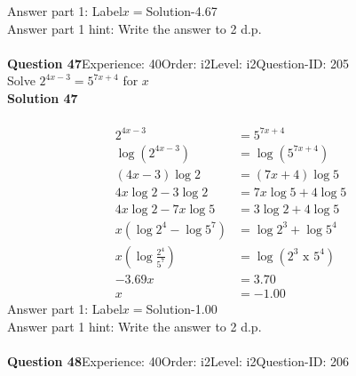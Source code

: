 \documentclass{article}
\begin{document}
Answer part 1: \hspace{10pt}Label\hspace{10pt}$x=$\hspace{10pt}Solution\hspace{10pt}-4.67\\
Answer part 1 hint: \hspace{15pt}Write the answer to 2 d.p.\\
\\[4pt]
\noindent\textbf{Question 47}\hspace{20pt}Experience: 40\hspace{20pt}Order: i2\hspace{20pt}Level: i2\hspace{20pt}Question-ID: 205\\[2pt]
Solve $2^{4x-3}=5^{7x+4}$ for $x$\\[4pt]
\noindent\textbf{Solution 47}\\[2pt]
\\[-35pt]\begin{align*}
2^{4x-3}&=5^{7x+4}\\[2pt]
\log(2^{4x-3})&=\log(5^{7x+4})\\[2pt]
(4x-3)\log2&=(7x+4)\log5\\[2pt]
4x\log2-3\log2&=7x\log5+4\log5\\[2pt]
4x\log2-7x\log5&=3\log2+4\log5\\[2pt]
x(\log2^4-\log5^7)&=\log2^3+\log5^4\\[2pt]
x\left(\log\displaystyle\frac{2^4}{5^7}\right)&=\log(2^3\,\,\text{x}\,\,5^4)\\[2pt]
-3.69x&=3.70\\[2pt]
x&=-1.00
\end{align*}
Answer part 1: \hspace{10pt}Label\hspace{10pt}$x=$\hspace{10pt}Solution\hspace{10pt}-1.00\\
Answer part 1 hint: \hspace{15pt}Write the answer to 2 d.p.\\
\\[4pt]
\noindent\textbf{Question 48}\hspace{20pt}Experience: 40\hspace{20pt}Order: i2\hspace{20pt}Level: i2\hspace{20pt}Question-ID: 206\\[2pt]
\end{document}
